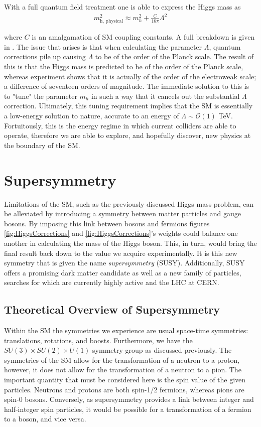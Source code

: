 \noindent With a full quantum field treatment one is able to express the Higgs mass as
\begin{align}
m_{\textrm{h, physical}}^{2} \approx m_{h}^{2} + \frac{C}{16 \pi} \Lambda^{2}
\end{align}

\noindent where $C$ is an amalgamation of SM coupling constants.
A full breakdown is given in \cite{baer2015supergravity}.
The issue that arises is that when calculating the parameter $\Lambda$, quantum corrections pile up causing $\Lambda$ to be of the order of the Planck scale.
The result of this is that the Higgs mass is predicted to be of the order of the Planck scale, whereas experiment shows that it is actually of the order of the electroweak scale; a difference of seventeen orders of magnitude.
The immediate solution to this is to "tune" the parameter $m_{h}$ in such a way that it cancels out the substantial $\Lambda$ correction.
Ultimately, this tuning requirement implies that the SM is essentially a low-energy solution to nature,  accurate to an energy of $\Lambda \sim \mathcal{O}(1)$ TeV.
Fortuitously, this is the energy regime in which current colliders are able to operate, therefore we are able to explore, and hopefully discover, new physics at the boundary of the SM.

\section{Supersymmetry}
Limitations of the SM, such as the previously discussed Higgs mass problem, can be alleviated by introducing a symmetry between matter particles and gauge bosons.
By imposing this link between bosons and fermions figures \ref{fig:HiggsCorrections} and \ref{fig:HiggsCorrections}'s weights could balance one another in calculating the mass of the Higgs boson. 
This, in turn, would bring the final result back down to the value we acquire experimentally.
It is this new symmetry that is given the name \textit{supersymmetry} (SUSY).
Additionally, SUSY offers a promising dark matter candidate as well as a new family of particles, searches for which are currently highly active and the LHC at CERN.

\subsection{Theoretical Overview of Supersymmetry}
Within the SM the symmetries we experience are usual space-time symmetries: translations, rotations, and boosts.
Furthermore, we have the $SU(3) \times SU(2) \times U(1)$ symmetry group as discussed previously.
The symmetries of the SM allow for the transformation of a neutron to a proton, however, it does not allow for the transformation of a neutron to a pion.
The important quantity that must be considered here is the spin value of the given particles.
Neutrons and protons are both spin-1/2 fermions, whereas pions are spin-0 bosons.
Conversely, as supersymmetry provides a link between integer and half-integer spin particles, it would be possible for a transformation of a fermion to a boson, and vice versa.

